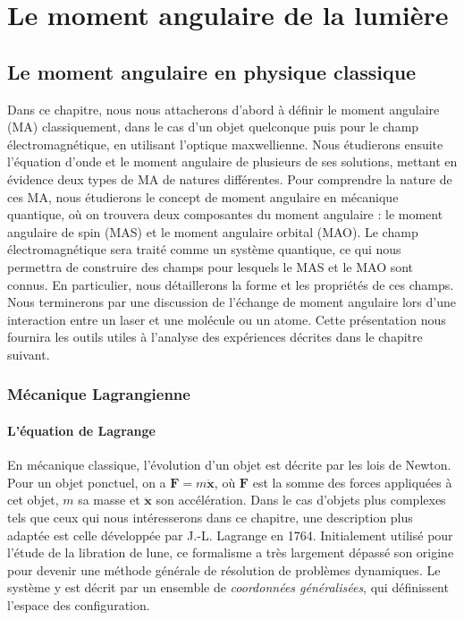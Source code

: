 \part{Le moment angulaire de la lumière}
\label{PA:LightAM}
\chapter{Le moment angulaire en physique classique}
\label{CH:ClassicAM}
Dans ce chapitre, nous nous attacherons d'abord à définir le moment angulaire (MA) classiquement, dans le cas d'un objet quelconque puis pour le champ électromagnétique, en utilisant l'optique maxwellienne. Nous étudierons ensuite l'équation d'onde et le moment angulaire de plusieurs de ses solutions, mettant en évidence deux types de MA de natures différentes. Pour comprendre la nature de ces MA, nous étudierons le concept de moment angulaire en mécanique quantique, où on trouvera deux composantes du moment angulaire : le moment angulaire de spin (MAS) et le moment angulaire orbital (MAO). Le champ électromagnétique sera traité comme un système quantique, ce qui nous permettra de construire des champs pour lesquels le MAS et le MAO sont connus. En particulier, nous détaillerons la forme et les propriétés de ces champs. Nous terminerons par une discussion de l'échange de moment angulaire lors d'une interaction entre un laser et une molécule ou un atome. Cette présentation nous fournira les outils utiles à l'analyse des expériences décrites dans le chapitre suivant.
\newpage
\section{Mécanique Lagrangienne}
\subsection{L'\'{e}quation de Lagrange}
\label{sec:lagrange}
En mécanique classique, l'évolution d'un objet est décrite par les lois de Newton. Pour un objet ponctuel, on a $\bm{F}=m\bm{\ddot{x}}$, où $\bm{F}$ est la somme des forces appliquées à cet objet, $m$ sa masse et $\bm{\ddot{x}}$ son accélération. Dans le cas d'objets plus complexes tels que ceux qui nous intéresserons dans ce chapitre, une description plus adaptée est celle développée par J.-L. Lagrange en 1764. Initialement utilisé pour l'étude de la libration de lune, ce formalisme a très largement dépassé son origine pour devenir une méthode générale de résolution de problèmes dynamiques. Le système y est décrit par un ensemble de \textit{coordonnées généralisées}, qui définissent l'espace des configuration. 

